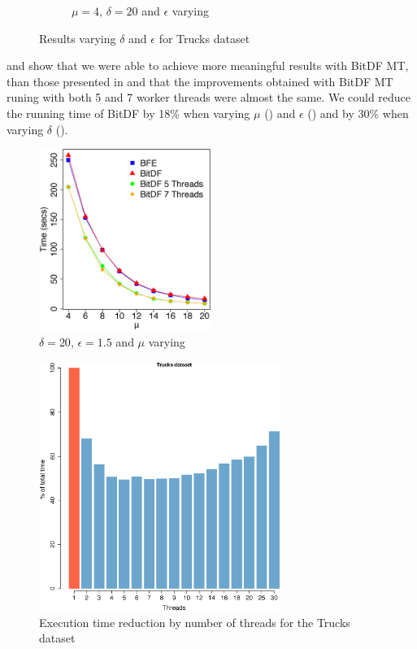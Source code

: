 {\begin{figure}[h!]
\begin{subfigure}[t]{0.49\textwidth}
        \caption{$\mu = 4$, $\delta = 20$ and $\epsilon$ varying}
        \label{fig:trucks_complete_vary_g}
    \end{subfigure}
    \caption{Results varying $\delta$ and $\epsilon$ for Trucks dataset}
    \label{fig:trucks_complete_results}
\end{figure}

 and  show that we were able to achieve more
meaningful results with BitDF MT, than those presented in  and that the improvements obtained with
BitDF MT runing with both 5 and 7 worker threads were almost the same. We could reduce the running time of BitDF by 18\%
when varying $\mu$ () and $\epsilon$ () and by
30\% when varying $\delta$ ().

\begin{figure}[h!]
    \centering
    \includegraphics[width=0.5\textwidth]{images/Trucks_complete_varying_n.eps}
    \caption{$\delta = 20$, $\epsilon = 1.5$ and $\mu$ varying}
    \label{fig:trucks_complete_vary_n}
\end{figure}

\begin{figure}[h!]
    \centering
    \includegraphics[width=0.7\textwidth]{images/Trucks_thread.eps}
    \caption{Execution time reduction by number of threads for the Trucks dataset}
    \label{fig:trucks_threads}
\end{figure}

}
